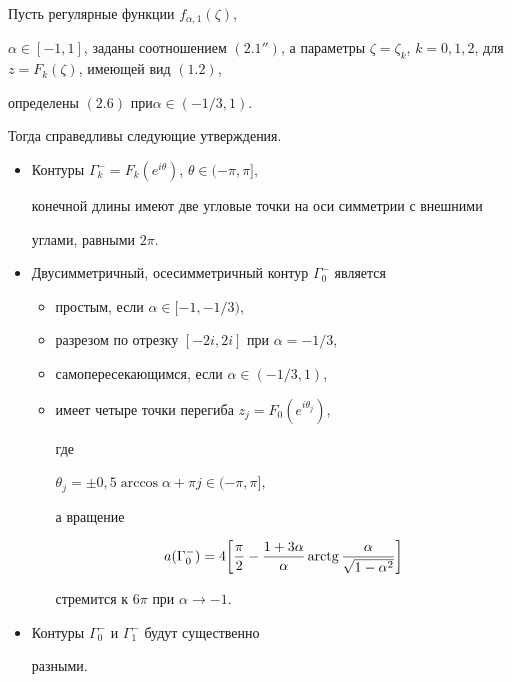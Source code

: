 \begin{thm}


Пусть регулярные функции $f_{\alpha,1}(\zeta)$,


$\alpha\in [-1,1]$, заданы соотношением $(2.1'')$, а параметры $\zeta=


\zeta_k$, $k=0,1,2$, для $z=F_k(\zeta)$, имеющей вид $(1.2)$,


определены $(2.6)$ при\linebreak $\alpha\in(-1/3,1)$.





Тогда справедливы следующие утверждения.


\begin{itemize}


\item[1.] Контуры ${\Gamma }_k^{-}=F_k(e^{i\theta})$, $\theta\in(-\pi,\pi]$,


конечной длины имеют две угловые точки на оси симметрии с внешними


углами, равными $2\pi$.





\item[2.] Двусимметричный, осесимметричный контур $\Gamma _0^{-}$ является


\begin{itemize}


\item[а)] простым, если $\alpha\in[-1,-1/3)$,


\item[б)] разрезом по отрезку $[-2i,2i]$ при $\alpha=-1/3$,


\item[в)] самопересекающимся, если $\alpha\in(-1/3,1)$,


\item[г)] имеет четыре точки перегиба $z_j=F_0(e^{i\theta_j})$,


где


$\theta_j=\pm0{,}5\arccos\alpha+\pi j\in(-\pi,\pi]$,


а вращение


\begin{equation}


a(\Gamma _0^{-})=4\bigg[\frac\pi 2-\frac{1+3\alpha}{\alpha}


\arctg\frac{\alpha}{\sqrt{1-\alpha^2}}\bigg]


\end{equation}


стремится к $6\pi$ при $\alpha\to -1$.


\end{itemize}


\item[3.] Контуры $\Gamma_0^{-}$ и $\Gamma_1^{-}$ будут существенно


разными.


\end{itemize}


\end{thm}





